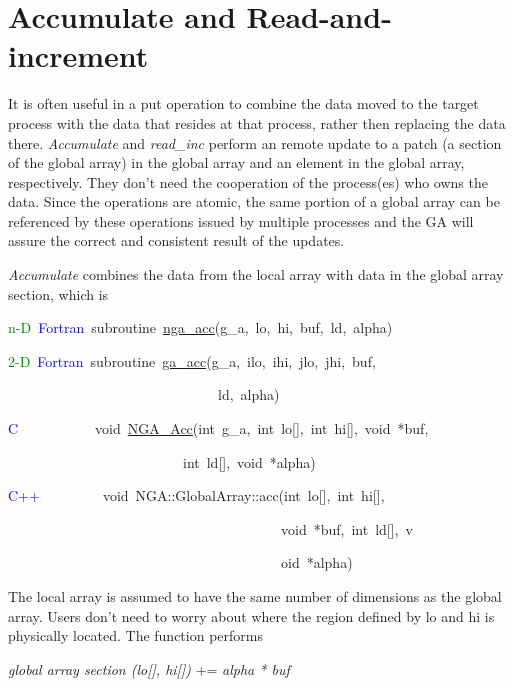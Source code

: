 \section{Accumulate and Read-and-increment }

It is often useful in a put operation to combine the data moved to
the target process with the data that resides at that process, rather
then replacing the data there. \emph{Accumulate} and \emph{read\_inc}
perform an  remote update to a patch (a section of the
global array) in the global array and an element in the global array,
respectively. They don't need the cooperation of the process(es) who
owns the data. Since the operations are atomic, the same portion of
a global array can be referenced by these operations issued by multiple
processes and the GA will assure the correct and consistent result
of the updates.

\emph{Accumulate} combines the data from the local array with data
in the global array section, which is
\begin{lyxcode}
\textcolor{green}{n-D}~\textcolor{blue}{Fortran}~subroutine~\href{http://www.emsl.pnl.gov/docs/global/ga_ops.html\#ga_acc}{nga\_{}acc}(g\_a,~lo,~hi,~buf,~ld,~alpha)~

\textcolor{green}{2-D}~\textcolor{blue}{Fortran}~subroutine~\href{http://www.emsl.pnl.gov/docs/global/ga_ops.html\#ga_acc}{ga\_{}acc}(g\_a,~ilo,~ihi,~jlo,~jhi,~buf,~

~~~~~~~~~~~~~~~~~~~~~~~~~~~~~~ld,~alpha)~

\textcolor{blue}{C}~~~~~~~~~~~void~\href{http://www.emsl.pnl.gov/docs/global/c_nga_ops.html\#ga_acc}{NGA\_{}Acc}(int~g\_a,~int~lo{[}{]},~int~hi{[}{]},~void~{*}buf,~

~~~~~~~~~~~~~~~~~~~~~~~~~int~ld{[}{]},~void~{*}alpha)~

\textcolor{blue}{C++}~~~~~~~~~void~NGA::GlobalArray::acc(int~lo{[}{]},~int~hi{[}{]},~

~~~~~~~~~~~~~~~~~~~~~~~~~~~~~~~~~~~~~~~void~{*}buf,~int~ld{[}{]},~v

~~~~~~~~~~~~~~~~~~~~~~~~~~~~~~~~~~~~~~~oid~{*}alpha)
\end{lyxcode}
The local array is assumed to have the same number of dimensions as
the global array. Users don't need to worry about where the region
defined by lo and hi is physically located. The function performs

\emph{global array section (lo{[}{]}, hi{[}{]})} += \emph{alpha {*}
buf}

